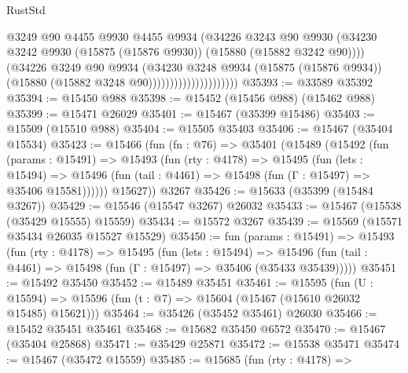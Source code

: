 \begin{lexlean}{RustStd}
\begin{coremodule}
                                      @3249
                                      @90
                                      @4455
                                      @9930
                                      @4455
                                      @9934
                                      (@34226
                                        @3243
                                        @90
                                        @9930
                                        (@34230
                                          @3242
                                          @9930
                                          (@15875 (@15876 @9930))
                                          (@15880 (@15882 @3242 @90))))
                                      (@34226
                                        @3249
                                        @90
                                        @9934
                                        (@34230
                                          @3248
                                          @9934
                                          (@15875 (@15876 @9934))
                                          (@15880 (@15882 @3248 @90)))))))))))))))))))))
@35393 := @33589 @35392
@35394 := @15450 @988
@35398 := @15452 (@15456 @988) (@15462 @988)
@35399 := @15471 @26029
@35401 := @15467 (@35399 @15486)
@35403 := @15509 (@15510 @988)
@35404 := @15505 @35403
@35406 := @15467 (@35404 @15534)
@35423 := @15466
    (fun (fn : @76) =>
    @35401
      (@15489
        (@15492
          (fun (params : @15491) =>
          @15493
            (fun (rty : @4178) =>
            @15495
              (fun (lets : @15494) =>
              @15496 (fun (tail : @4461) => @15498 (fun (Γ : @15497) => @35406 @15581))))))
        @15627))
    @3267
@35426 := @15633 (@35399 (@15484 @3267))
@35429 := @15546 (@15547 @3267) @26032
@35433 := @15467 (@15538 (@35429 @15555) @15559)
@35434 := @15572 @3267
@35439 := @15569 (@15571 @35434 @26035 @15527 @15529)
@35450 := fun (params : @15491) =>
  @15493
    (fun (rty : @4178) =>
    @15495
      (fun (lets : @15494) =>
      @15496 (fun (tail : @4461) => @15498 (fun (Γ : @15497) => @35406 (@35433 @35439)))))
@35451 := @15492 @35450
@35452 := @15489 @35451
@35461 := @15595
    (fun (U : @15594) => @15596 (fun (t : @7) => @15604 (@15467 (@15610 @26032 @15485) @15621)))
@35464 := @35426 (@35452 @35461) @26030
@35466 := @15452 @35451 @35461
@35468 := @15682 @35450 @6572
@35470 := @15467 (@35404 @25868)
@35471 := @35429 @25871
@35472 := @15538 @35471
@35474 := @15467 (@35472 @15559)
@35485 := @15685
    (fun (rty : @4178) =>

\end{coremodule}
\end{lexlean}
